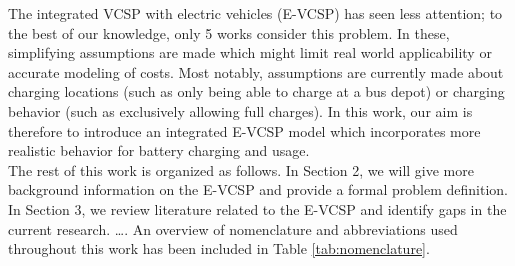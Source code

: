 \documentclass[]{article}
\begin{document}
The integrated VCSP with electric vehicles (E-VCSP) has seen less attention; to the best of our knowledge, only 5 works consider this problem. In these, simplifying assumptions are made which might limit real world applicability or accurate modeling of costs. Most notably, assumptions are currently made about charging locations (such as only being able to charge at a bus depot) or charging behavior (such as exclusively allowing full charges). In this work, our aim is therefore to introduce an integrated E-VCSP model which incorporates more realistic behavior for battery charging and usage. \\
The rest of this work is organized as follows. In Section 2, we will give more background information on the E-VCSP and provide a formal problem definition. In Section 3, we review literature related to the E-VCSP and identify gaps in the current research. \dots. An overview of nomenclature and abbreviations used throughout this work has been included in Table \ref{tab:nomenclature}.
\end{document}
